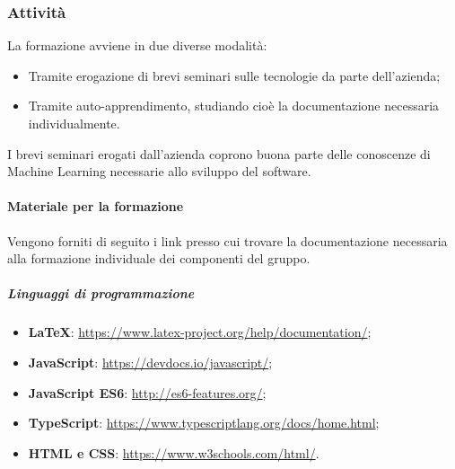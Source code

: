\subsubsection{Attività}
La formazione avviene in due diverse modalità:
\begin{itemize}
  \item Tramite erogazione di brevi seminari sulle tecnologie da parte dell'azienda;
  \item Tramite auto-apprendimento, studiando cioè la documentazione necessaria individualmente.
\end{itemize}
I brevi seminari erogati dall'azienda coprono buona parte delle conoscenze di Machine Learning necessarie allo sviluppo del software.
\paragraph{Materiale per la formazione}
Vengono forniti di seguito i link presso cui trovare la documentazione necessaria alla formazione individuale dei componenti del gruppo.

\subparagraph*{Linguaggi di programmazione}
\begin{itemize}
  \item \textbf{\LaTeX}: \href{https://www.latex-project.org/help/documentation/}{https://www.latex-project.org/help/documentation/};
  \item \textbf{JavaScript}: \href{https://devdocs.io/javascript/}{https://devdocs.io/javascript/};
  \item \textbf{JavaScript ES6}: \href{http://es6-features.org/}{http://es6-features.org/};
  \item \textbf{TypeScript}: \href{https://www.typescriptlang.org/docs/home.html}{https://www.typescriptlang.org/docs/home.html};
  \item \textbf{HTML e CSS}: \href{https://www.w3schools.com/html/}{https://www.w3schools.com/html/}.
\end{itemize}

